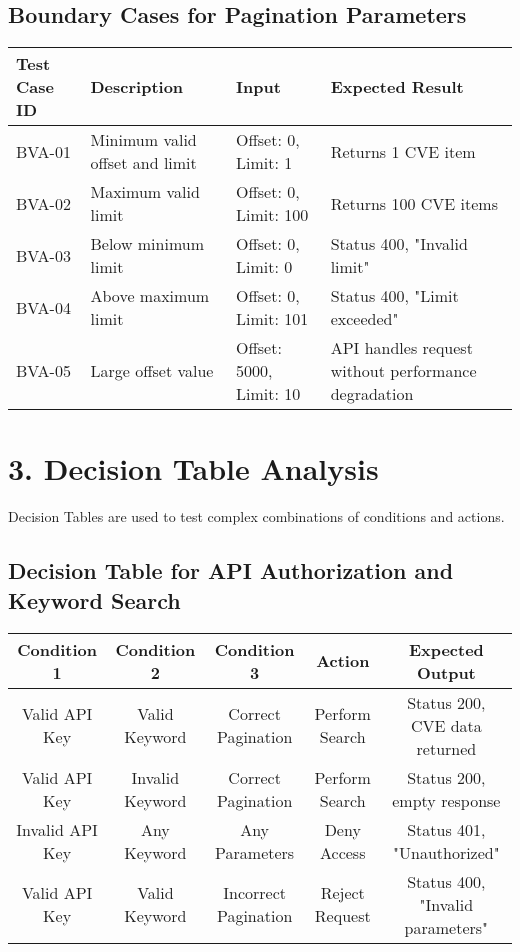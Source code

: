 \documentclass[a4paper,12pt]{article}
\begin{document}
\subsection*{Boundary Cases for Pagination Parameters}
\begin{longtable}{|p{2cm}|p{6cm}|p{4cm}|p{3cm}|}
\hline
\textbf{Test Case ID} & \textbf{Description} & \textbf{Input} & \textbf{Expected Result} \\
\hline
BVA-01 & Minimum valid offset and limit & Offset: 0, Limit: 1 & Returns 1 CVE item \\
\hline
BVA-02 & Maximum valid limit & Offset: 0, Limit: 100 & Returns 100 CVE items \\
\hline
BVA-03 & Below minimum limit & Offset: 0, Limit: 0 & Status 400, "Invalid limit" \\
\hline
BVA-04 & Above maximum limit & Offset: 0, Limit: 101 & Status 400, "Limit exceeded" \\
\hline
BVA-05 & Large offset value & Offset: 5000, Limit: 10 & API handles request without performance degradation \\
\hline
\end{longtable}

\section*{3. Decision Table Analysis}
Decision Tables are used to test complex combinations of conditions and actions.

\subsection*{Decision Table for API Authorization and Keyword Search}
\begin{longtable}{|c|c|c|c|c|}
\hline
\textbf{Condition 1} & \textbf{Condition 2} & \textbf{Condition 3} & \textbf{Action} & \textbf{Expected Output} \\
\hline
Valid API Key & Valid Keyword & Correct Pagination & Perform Search & Status 200, CVE data returned \\
\hline
Valid API Key & Invalid Keyword & Correct Pagination & Perform Search & Status 200, empty response \\
\hline
Invalid API Key & Any Keyword & Any Parameters & Deny Access & Status 401, "Unauthorized" \\
\hline
Valid API Key & Valid Keyword & Incorrect Pagination & Reject Request & Status 400, "Invalid parameters" \\
\hline
\end{longtable}
\end{document}
